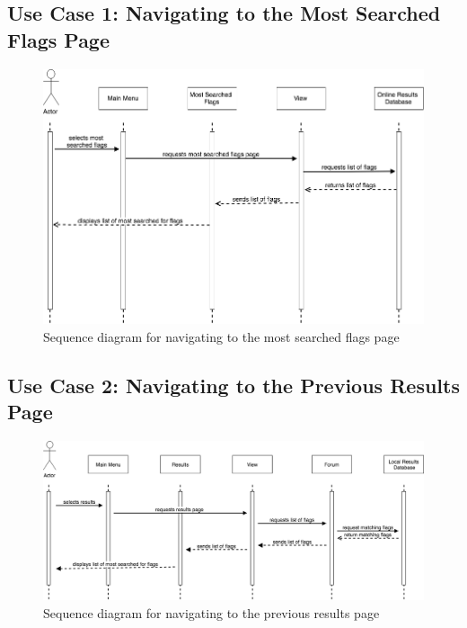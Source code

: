 \documentclass[12pt,fleqn]{article}
\begin{document}
\subsection{Use Case 1: Navigating to the Most Searched Flags Page}
\begin{figure}[H]
    \centering
    \includegraphics[scale=0.45]{img/SD2.png}
    \caption{Sequence diagram for navigating to the most searched flags page}
\end{figure}

\subsection{Use Case 2: Navigating to the Previous Results Page}
\begin{figure}[H]
    \centering
    \includegraphics[scale=0.44]{img/SD3.png}
    \caption{Sequence diagram for navigating to the previous results page}

\end{figure}
\end{document}
